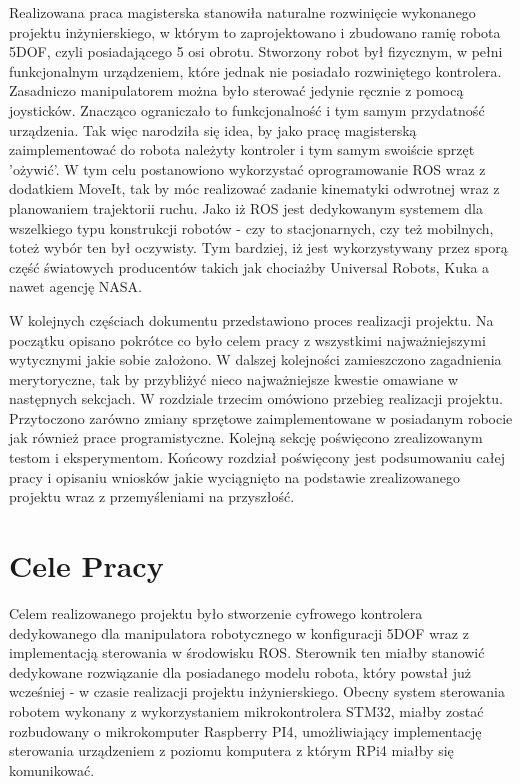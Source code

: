 
Realizowana praca magisterska stanowiła naturalne rozwinięcie wykonanego projektu inżynierskiego, w którym to zaprojektowano i zbudowano ramię robota 5DOF, czyli posiadającego 5 osi obrotu. Stworzony robot był fizycznym, w pełni funkcjonalnym urządzeniem, które jednak nie posiadało rozwiniętego kontrolera. Zasadniczo manipulatorem można było sterować jedynie ręcznie z pomocą joysticków. Znacząco ograniczało to funkcjonalność i tym samym przydatność urządzenia. Tak więc narodziła się idea, by jako pracę magisterską zaimplementować do robota należyty kontroler i tym samym swoiście sprzęt 'ożywić'. W tym celu postanowiono wykorzystać oprogramowanie ROS wraz z dodatkiem MoveIt, tak by móc realizować zadanie kinematyki odwrotnej wraz z planowaniem trajektorii ruchu. Jako iż ROS jest dedykowanym systemem dla wszelkiego typu konstrukcji robotów - czy to stacjonarnych, czy też mobilnych, toteż wybór ten był oczywisty. Tym bardziej, iż jest wykorzystywany przez sporą część światowych producentów takich jak chociażby Universal Robots, Kuka a nawet agencję NASA. 

W kolejnych częściach dokumentu przedstawiono proces realizacji projektu. Na początku opisano pokrótce co było celem pracy z wszystkimi najważniejszymi wytycznymi jakie sobie założono. W dalszej kolejności zamieszczono zagadnienia merytoryczne, tak by przybliżyć nieco najważniejsze kwestie omawiane w następnych sekcjach. W rozdziale trzecim omówiono przebieg realizacji projektu. Przytoczono zarówno zmiany sprzętowe zaimplementowane w posiadanym robocie jak również prace programistyczne. Kolejną sekcję poświęcono zrealizowanym testom i eksperymentom. 
Końcowy rozdział poświęcony jest podsumowaniu całej pracy i opisaniu wniosków jakie wyciągnięto na podstawie zrealizowanego projektu wraz z przemyśleniami na przyszłość.


\section{Cele Pracy}
\label{sec:celePracy}


Celem realizowanego projektu było stworzenie cyfrowego kontrolera dedykowanego  dla
manipulatora robotycznego w konfiguracji 5DOF wraz z implementacją
sterowania w środowisku ROS. Sterownik ten miałby stanowić dedykowane rozwiązanie
dla posiadanego modelu robota, który powstał  już wcześniej - w czasie realizacji projektu
inżynierskiego. Obecny system sterowania robotem wykonany z
wykorzystaniem mikrokontrolera STM32, miałby zostać rozbudowany o
mikrokomputer Raspberry PI4,  umożliwiający implementację sterowania urządzeniem z poziomu komputera z którym RPi4 miałby się komunikować.

